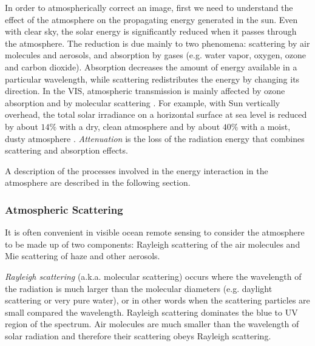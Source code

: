 In order to atmospherically correct an image, first we need to understand the effect of the atmosphere on the propagating energy generated in the sun. Even with clear sky, the solar energy is significantly reduced when it passes through the atmosphere. The reduction is due mainly to two phenomena: scattering by air molecules and aerosols, and absorption by gases (e.g. water vapor, oxygen, ozone and carbon dioxide). Absorption decreases the amount of energy available in a particular wavelength, while scattering redistributes the energy by changing its direction. In the VIS, atmospheric transmission is mainly affected by ozone absorption and by molecular scattering \cite{Asrar1989}. For example, with Sun vertically overhead, the total solar irradiance on a horizontal surface at sea level is reduced by about $14\%$ with a dry, clean atmosphere and by about $40\%$ with a moist, dusty atmosphere \cite{Kirk1983}. {\it Attenuation} is the loss of the radiation energy that combines scattering and absorption effects.



A description of the processes involved in the energy interaction in the atmosphere are described in the following section. %
\subsubsection*{Atmospheric Scattering}

It is often convenient in visible ocean remote sensing to consider the atmosphere to be made up of two components: Rayleigh scattering of the air molecules and Mie scattering of haze and other aerosols. 

{\it Rayleigh scattering}  (a.k.a. molecular scattering) occurs where the wavelength of the radiation is much larger than the molecular diameters (e.g. daylight scattering or very pure water), or in other words when the scattering particles are small compared the wavelength. Rayleigh scattering dominates the blue to UV region of the spectrum. Air molecules are much smaller than the wavelength of solar radiation and therefore their scattering obeys Rayleigh scattering. 

